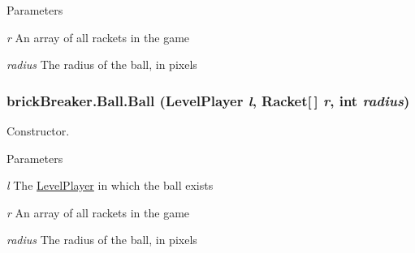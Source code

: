 \begin{DoxyParams}{Parameters}
\item[{\em r}]An array of all rackets in the game \item[{\em radius}]The radius of the ball, in pixels \end{DoxyParams}
\hypertarget{classbrick_breaker_1_1_ball_ae797eeb30e776dbe48357107816db887}{
\subsubsection[{Ball}]{\setlength{\rightskip}{0pt plus 5cm}brickBreaker.Ball.Ball ({\bf LevelPlayer} {\em l}, \/  {\bf Racket}\mbox{[}$\,$\mbox{]} {\em r}, \/  int {\em radius})}}
\label{classbrick_breaker_1_1_ball_ae797eeb30e776dbe48357107816db887}
Constructor.


\begin{DoxyParams}{Parameters}
\item[{\em l}]The \hyperlink{classbrick_breaker_1_1_level_player}{LevelPlayer} in which the ball exists \item[{\em r}]An array of all rackets in the game \item[{\em radius}]The radius of the ball, in pixels \end{DoxyParams}


